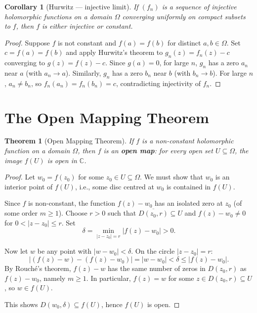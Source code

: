 \documentclass[12pt,a4paper,openany]{book}
\theoremstyle{definition}
\theoremstyle{plain}
\newtheorem{theorem}[definition]{Theorem}
\newtheorem{corollary}[definition]{Corollary}
\theoremstyle{remark}
\newcommand{\C}{\mathbb{C}}
\newcommand{\abs}[1]{\left|#1\right|}
\begin{document}
\begin{corollary}[Hurwitz — injective limit]\label{cor:hurwitz-injective}
If $(f_n)$ is a sequence of injective holomorphic functions on a domain $\Omega$
converging uniformly on compact subsets to $f$, then $f$ is either injective
or constant.
\end{corollary}

\begin{proof}
Suppose $f$ is not constant and $f(a) = f(b)$ for distinct $a, b \in \Omega$.
Set $c = f(a) = f(b)$ and apply Hurwitz's theorem to $g_n(z) = f_n(z) - c$
converging to $g(z) = f(z) - c$. Since $g(a) = 0$, for large $n$,
$g_n$ has a zero $a_n$ near $a$ (with $a_n \to a$). Similarly, $g_n$ has
a zero $b_n$ near $b$ (with $b_n \to b$). For large $n$, $a_n \neq b_n$,
so $f_n(a_n) = f_n(b_n) = c$, contradicting injectivity of $f_n$.
\end{proof}

\section{The Open Mapping Theorem}\label{sec:open-mapping}

\begin{theorem}[Open Mapping Theorem]\label{thm:open-mapping}
If $f$ is a non-constant holomorphic function on a domain $\Omega$,
then $f$ is an \textbf{open map}: for every open set $U \subseteq \Omega$,
the image $f(U)$ is open in $\C$.
\end{theorem}

\begin{proof}
Let $w_0 = f(z_0)$ for some $z_0 \in U \subseteq \Omega$. We must show
that $w_0$ is an interior point of $f(U)$, i.e., some disc centred at
$w_0$ is contained in $f(U)$.

Since $f$ is non-constant, the function $f(z) - w_0$ has an isolated zero
at $z_0$ (of some order $m \geq 1$). Choose $r > 0$ such that
$\overline{D(z_0, r)} \subseteq U$ and $f(z) - w_0 \neq 0$ for
$0 < \abs{z - z_0} \leq r$. Set
\[
  \delta = \min_{\abs{z - z_0} = r} \abs{f(z) - w_0} > 0.
\]

Now let $w$ be any point with $\abs{w - w_0} < \delta$. On the circle
$\abs{z - z_0} = r$:
\[
  \abs{(f(z) - w) - (f(z) - w_0)} = \abs{w - w_0} < \delta
  \leq \abs{f(z) - w_0}.
\]
By Rouch\'{e}'s theorem, $f(z) - w$ has the same number of zeros in
$D(z_0, r)$ as $f(z) - w_0$, namely $m \geq 1$. In particular,
$f(z) = w$ for some $z \in D(z_0, r) \subseteq U$, so $w \in f(U)$.

This shows $D(w_0, \delta) \subseteq f(U)$, hence $f(U)$ is open.
\end{proof}
\end{document}
